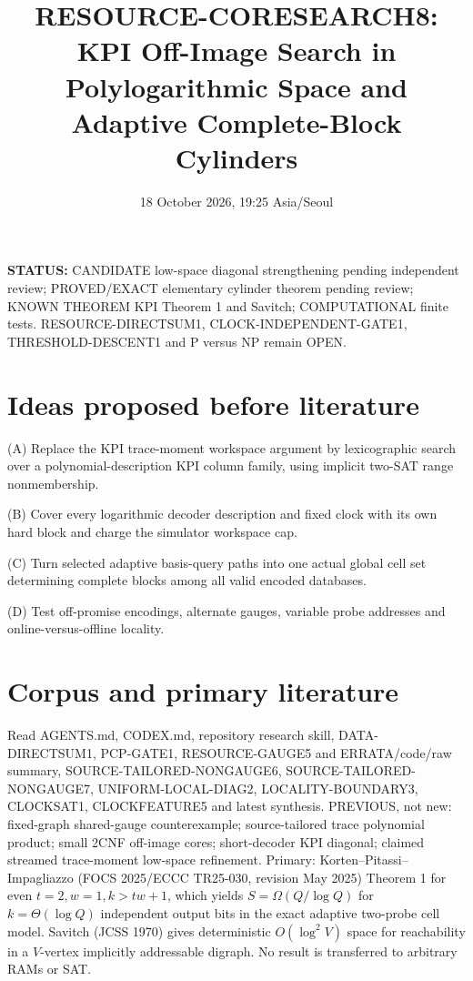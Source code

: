 \documentclass[11pt]{article}
\title{RESOURCE-CORESEARCH8: KPI Off-Image Search in Polylogarithmic Space and Adaptive Complete-Block Cylinders}
\date{18 October 2026, 19:25 Asia/Seoul}
\begin{document}
\maketitle
\noindent\textbf{STATUS:} CANDIDATE low-space diagonal strengthening pending independent review; PROVED/EXACT elementary cylinder theorem pending review; KNOWN THEOREM KPI Theorem 1 and Savitch; COMPUTATIONAL finite tests. RESOURCE-DIRECTSUM1, CLOCK-INDEPENDENT-GATE1, THRESHOLD-DESCENT1 and P versus NP remain OPEN.
\section{Ideas proposed before literature}
\item[] (A) Replace the KPI trace-moment workspace argument by lexicographic search over a polynomial-description KPI column family, using implicit two-SAT range nonmembership. 
\item[] (B) Cover every logarithmic decoder description and fixed clock with its own hard block and charge the simulator workspace cap. 
\item[] (C) Turn selected adaptive basis-query paths into one actual global cell set determining complete blocks among all valid encoded databases. 
\item[] (D) Test off-promise encodings, alternate gauges, variable probe addresses and online-versus-offline locality.
\section{Corpus and primary literature}
Read AGENTS.md, CODEX.md, repository research skill, DATA-DIRECTSUM1, PCP-GATE1, RESOURCE-GAUGE5 and ERRATA/code/raw summary, SOURCE-TAILORED-NONGAUGE6, SOURCE-TAILORED-NONGAUGE7, UNIFORM-LOCAL-DIAG2, LOCALITY-BOUNDARY3, CLOCKSAT1, CLOCKFEATURE5 and latest synthesis. PREVIOUS, not new: fixed-graph shared-gauge counterexample; source-tailored trace polynomial product; small 2CNF off-image cores; short-decoder KPI diagonal; claimed streamed trace-moment low-space refinement. Primary: Korten--Pitassi--Impagliazzo (FOCS 2025/ECCC TR25-030, revision May 2025) Theorem 1 for even $t=2,w=1,k>tw+1$, which yields $S=\Omega(Q/\log Q)$ for $k=\Theta(\log Q)$ independent output bits in the exact adaptive two-probe cell model. Savitch (JCSS 1970) gives deterministic $O(\log^2 V)$ space for reachability in a $V$-vertex implicitly addressable digraph. No result is transferred to arbitrary RAMs or SAT.
\end{document}
